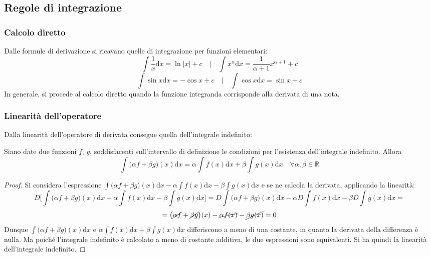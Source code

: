 \documentclass[10pt]{article}
\theoremstyle{plain}
\begin{document}
\subsection{Regole di integrazione}
\subsubsection{Calcolo diretto}
Dalle formule di derivazione si ricavano quelle di integrazione per funzioni elementari:
\[\int \frac{1}{x}\textrm{d}x = \ln|x| + c \quad \bigg| \quad \int x^\alpha\textrm{d}x = \frac{1}{\alpha + 1} x^{\alpha + 1} + c\]
\[\int \sin{x}\textrm{d}x = - \cos{x} + c \quad \bigg| \quad \int \cos{x}\textrm{d}x = \sin{x} + c\]
In generale, si procede al calcolo diretto quando la funzione integranda corrisponde alla derivata di una nota.
\subsubsection{Linearità dell'operatore}
Dalla linearità dell'operatore di derivata consegue quella dell'integrale indefinito:
\begin{prop}
    Siano date due funzioni $f$, $g$, soddisfacenti sull'intervallo di definizione le condizioni per l'esistenza dell'integrale indefinito. Allora
    \[\int\big(\alpha f + \beta g\big)(x)\textrm{d}x = \alpha \int f(x)\textrm{d}x + \beta \int g(x) \textrm{d}x\quad \forall \alpha, \beta \in \mathbb{R}\]
\end{prop}
\begin{proof}
    Si considera l'espressione $\int\big(\alpha f + \beta g\big)(x)\textrm{d}x - \alpha \int f(x)\textrm{d}x - \beta \int g(x) \textrm{d}x$ e se ne calcola la derivata, applicando la linearità:
    \[D\bigg[\int\big(\alpha f + \beta g\big)(x)\textrm{d}x - \alpha \int f(x)\textrm{d}x - \beta \int g(x) \textrm{d}x\bigg] = D\int\big(\alpha f + \beta g\big)(x)\textrm{d}x - \alpha D\int f(x)\textrm{d}x - \beta D\int g(x) \textrm{d}x =\]
    \[= \big(\cancel{\alpha f} + \cancel{\beta g}\big)(x) - \cancel{\alpha f(x)} - \cancel{\beta g(x)} = 0\]
    Dunque $\int\big(\alpha f + \beta g\big)(x)\textrm{d}x$ e $\alpha \int f(x)\textrm{d}x + \beta \int g(x) \textrm{d}x$ differiscono a meno di una costante, in quanto la derivata della differenza è nulla. Ma poiché l'integrale indefinito è calcolato a meno di costante additiva, le due espressioni sono equivalenti. Si ha quindi la linearità dell'integrale indefinito.
\end{proof}
\end{document}
